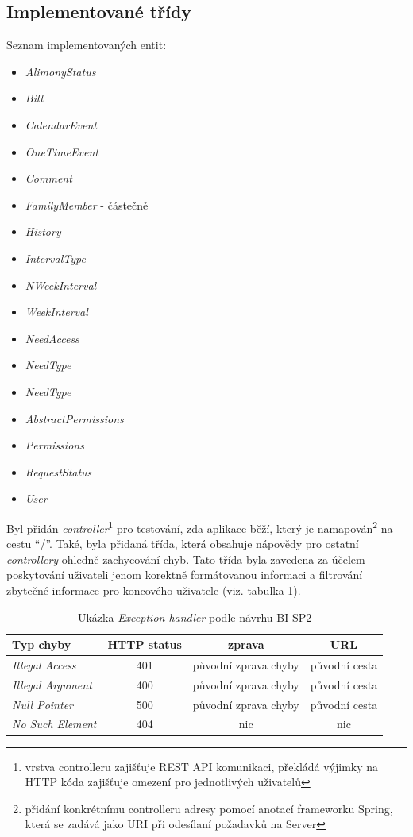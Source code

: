     \subsection{Implementované třídy}
        Seznam implementovaných entit:
        \begin{itemize}
            \item \textit{AlimonyStatus}
            \item \textit{Bill}
            \item \textit{CalendarEvent}
            \item \textit{OneTimeEvent}
            \item \textit{Comment}
            \item \textit{FamilyMember} - částečně
            \item \textit{History}
            \item \textit{IntervalType}
            \item \textit{NWeekInterval}
            \item \textit{WeekInterval}
            \item \textit{NeedAccess}
            \item \textit{NeedType}
            \item \textit{NeedType}
            \item \textit{AbstractPermissions}
            \item \textit{Permissions}
            \item \textit{RequestStatus}
            \item \textit{User}
        \end{itemize}
        
        Byl přidán \textit{controller}\footnote{vrstva controlleru zajišťuje REST API komunikaci, překládá výjimky na HTTP kóda zajišťuje omezení pro jednotlivých uživatelů} pro testování, zda aplikace běží, který je namapován\footnote{přidání konkrétnímu controlleru adresy pomocí anotací frameworku Spring, která se zadává jako URI při odesílaní požadavků na Server} na cestu \enquote{/}. Také, byla přidaná třída, která obsahuje nápovědy pro ostatní \textit{controllery} ohledně zachycování chyb. Tato třída byla zavedena za účelem poskytování uživateli jenom korektně formátovanou informaci  a filtrování zbytečné informace pro koncového uživatele (viz. tabulka \ref{tab:excpetion-handler1}). 
        \begin{table}\centering
	    \caption[Exception handler]{Ukázka \textit{Exception handler} podle návrhu BI-SP2}\label{tab:excpetion-handler1}
	    \begin{tabular}{|l|c|c|c|}\hline
		  Typ chyby		& HTTP status		& zprava	& URL	\tabularnewline \hline \hline
		  \textit{Illegal Access}	& 401	& původní zprava chyby		& původní cesta     \tabularnewline \hline
		  \textit{Illegal Argument}	& 400	& původní zprava chyby		& původní cesta     \tabularnewline \hline
		  \textit{Null Pointer}	& 500	& původní zprava chyby		& původní cesta     \tabularnewline \hline
		  \textit{No Such Element}	& 404	& nic		& nic     \tabularnewline \hline
	    \end{tabular}
        \end{table}
    
